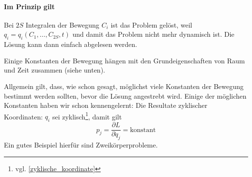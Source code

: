 \documentclass[oneside]{book}
\theoremstyle{definition}
\newcommand{\ffpartial}[2]{\frac{\partial #1}{\partial #2}}
\begin{document}
\paragraph{Im Prinzip gilt} Bei $2S$ Integralen der Bewegung $C_i$ ist das Problem gelöst, weil $q_i = q_i(C_1, \dots, C_{2S}, t)$ und damit das Problem nicht mehr dynamisch ist. Die Lösung kann dann einfach abgelesen werden.

Einige Konstanten der Bewegung hängen mit den Grundeigenschaften von Raum und Zeit zusammen (siehe unten).

Allgemein gilt, dass, wie schon gesagt, möglichst viele Konstanten der Bewegung bestimmt werden sollten, bevor die Lösung angestrebt wird. Einige der möglichen Konstanten haben wir schon kennengelernt: Die Resultate zyklischer Koordinaten: $q_i$ sei zyklisch\footnote{vgl. \ref{zyklische_koordinate}}, damit gilt
$$p_j = \ffpartial{L}{\dot{q}_j} = \text{konstant}$$
Ein gutes Beispiel hierfür sind Zweikörperprobleme.
\end{document}
